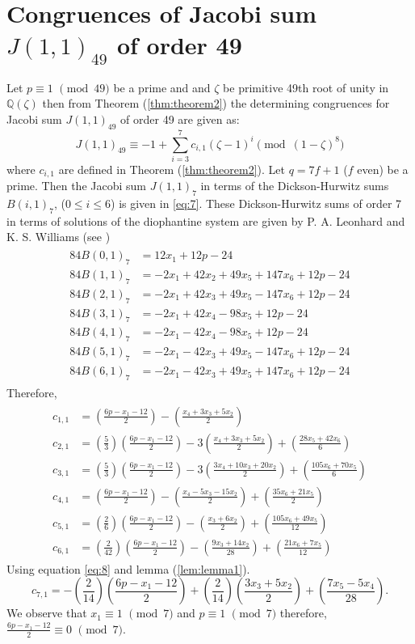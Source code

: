 \documentclass[a4paper,12pt]{article}
\def\vpmod{\!\!\!\pmod}
\begin{document}
\section {Congruences of Jacobi sum $J(1,1)_{49}$ of order 49}
 Let $p\equiv 1\,\,\vpmod {49}$ be a prime and and $\zeta$ be primitive 49th root of unity in $\mathbb{Q}(\zeta)$ then from Theorem (\ref{thm:theorem2}) the determining congruences for Jacobi sum $J(1,1)_{49}$ of order 49 are given as:
$$J(1,1)_{49}\equiv -1 + \displaystyle{\sum_{i=3}^{7}c_{i,1}(\zeta -1)^i} \vpmod{(1-\zeta)^{8}}$$
where $c_{i,1}$ are defined in Theorem (\ref{thm:theorem2}).
Let $q=7f+1$ ($f$ even) be a prime. Then the Jacobi sum $J(1,1)_{7}$ in terms of the Dickson-Hurwitz sums $B(i,1)_{7}$, ($0\leq i\leq 6$) is given in \eqref{eq:7}. 
These Dickson-Hurwitz sums of order 7 in terms of solutions of the diophantine system are given by P. A. Leonhard and K. S. Williams (see \cite{11})
\begin{eqnarray}\label{eq:10}
\begin{aligned}
84B(0,1)_{7}&=12x_{1}+12p-24\\
84B(1,1)_{7}&=-2x_{1}+42x_{2}+49x_{5}+147x_{6}+12p-24\\
84B(2,1)_{7}&=-2x_{1}+42x_{3}+49x_{5}-147x_{6}+12p-24\\
84B(3,1)_{7}&=-2x_{1}+42x_{4}-98x_{5}+12p-24\\
84B(4,1)_{7}&=-2x_{1}-42x_{4}-98x_{5}+12p-24\\
84B(5,1)_{7}&=-2x_{1}-42x_{3}+49x_{5}-147x_{6}+12p-24\\
84B(6,1)_{7}&=-2x_{1}-42x_{3}+49x_{5}+147x_{6}+12p-24
\end{aligned}
\end{eqnarray}
Therefore,
\begin{eqnarray}\label{eq:11}
\begin{aligned}
c_{1,1}&=(\frac{6p-x_{1}-12}{2})-(\frac{x_{4}+3x_{3}+5x_{2}}{2})\\
c_{2,1}&=(\frac{5}{3})(\frac{6p-x_{1}-12}{2})-3(\frac{x_{4}+3x_{3}+5x_{2}}{2})+(\frac{28x_{5}+42x_{6}}{6})\\
c_{3,1}&=(\frac{5}{3})(\frac{6p-x_{1}-12}{2})-3(\frac{3x_{4}+10x_{3}+20x_{2}}{2})+(\frac{105x_{6}+70x_{5}}{6})\\
c_{4,1}&=(\frac{6p-x_{1}-12}{2})-(\frac{x_{4}-5x_{3}-15x_{2}}{2})+(\frac{35x_{6}+21x_{5}}{2})\\
c_{5,1}&=(\frac{2}{6})(\frac{6p-x_{1}-12}{2})-(\frac{x_{3}+6x_{2}}{2})+(\frac{105x_{6}+49x_{5}}{12})\\
c_{6,1}&=(\frac{2}{42})(\frac{6p-x_{1}-12}{2})-(\frac{9x_{3}+14x_{2}}{28})+(\frac{21x_{6}+7x_{5}}{12})
\end{aligned}
\end{eqnarray}
Using equation \eqref{eq:8} and lemma (\ref{lem:lemma1}).
\begin{equation*}
c_{7,1}=-(\frac{2}{14})(\frac{6p-x_{1}-12}{2})+(\frac{2}{14})(\frac{3x_{3}+5x_{2}}{2})+(\frac{7x_{5}-5x_{4}}{28}).
\end{equation*}
We observe that $x_{1}\equiv 1\,\,\vpmod 7 $ and $p\equiv 1\,\,\vpmod 7$ therefore, $\displaystyle{\frac{6p-x_{1}-12}{2}\equiv 0\,\,\vpmod 7}$.
\end{document}
